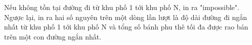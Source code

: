 Nếu không tồn tại đường đi từ khu phố 1 tới khu phố N, in ra "impossible". Ngược lại, in ra hai số nguyên trên một dòng lần lượt là độ dài đường đi ngắn nhất từ khu phố 1 tới khu phố N và tổng số bánh phu thê tối đa được rao bán trên một con đường ngắn nhất.